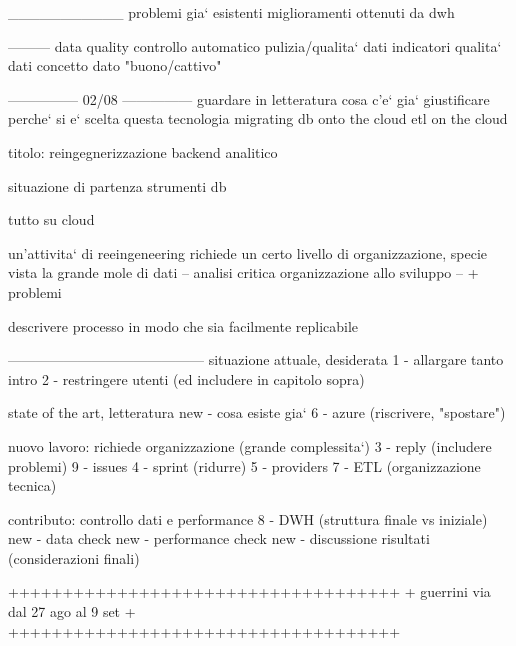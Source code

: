 ___________
problemi gia` esistenti
miglioramenti ottenuti da dwh

---------
data quality
    controllo automatico pulizia/qualita` dati
    indicatori qualita` dati
    concetto dato "buono/cattivo"

--------------- 02/08 ---------------
guardare in letteratura cosa c'e` gia`
    giustificare perche` si e` scelta questa tecnologia
    migrating db onto the cloud
    etl on the cloud

titolo:
    reingegnerizzazione backend analitico
    
situazione di partenza
    strumenti
    db
    
    tutto su cloud
    
    un'attivita` di reeingeneering richiede un certo livello di organizzazione, specie vista la grande mole di dati
    -- analisi critica organizzazione allo sviluppo --
        + problemi
    
    descrivere processo in modo che sia facilmente replicabile
    
    
------------------------------------------
situazione attuale, desiderata
    1 - allargare tanto intro
    2 - restringere utenti (ed includere in capitolo sopra)

state of the art, letteratura
    new - cosa esiste gia`
    6 - azure (riscrivere, "spostare")

nuovo lavoro: richiede organizzazione (grande complessita`)
    3 - reply (includere problemi)
        9 - issues
    4 - sprint (ridurre)
        5 - providers
    7 - ETL (organizzazione tecnica)
    
contributo: controllo dati e performance
    8 - DWH (struttura finale vs iniziale)
    new - data check
    new - performance check
    new - discussione risultati (considerazioni finali)

++++++++++++++++++++++++++++++++++++
+ guerrini via dal 27 ago al 9 set +
++++++++++++++++++++++++++++++++++++